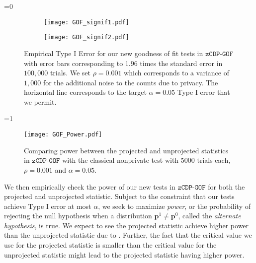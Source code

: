 \documentclass[twoside,letterpaper]{article} \usepackage{aistats2017}
\theoremstyle{definition}
\theoremstyle{remark}
\begin{document}
=0
\begin{figure}
\begin{center}
\begin{subfigure}{.45\textwidth}
\begin{flushleft}
\texttt{[image: GOF\_signif1.pdf]}
\end{flushleft}
\end{subfigure}
\hspace{10mm}
\begin{subfigure}{.1\textwidth}
\end{subfigure}
\begin{subfigure}{.45\textwidth}
\begin{flushright}
\texttt{[image: GOF\_signif2.pdf]}
\end{flushright}
\end{subfigure}
\caption{Empirical Type I Error for our new goodness of fit tests in ${\texttt{zCDP-GOF}}$ with error bars corresponding to 1.96 times the standard error in $100,000$ trials. We set $\rho = 0.001$ which corresponds to a variance of $1,000$ for the additional noise to the counts due to privacy.  The horizontal line corresponds to the target $\alpha = 0.05$ Type I error that we permit.  \label{fig:GOF_signif} }
\end{center}
\end{figure}
\fi

=1
\begin{figure}
\centering
\texttt{[image: GOF\_Power.pdf]}
\caption{\small Comparing power between the projected and unprojected statistics in ${\texttt{zCDP-GOF}}$ with the classical nonprivate test with $5000$ trials each, $\rho =0.001$ and $\alpha = 0.05$. \label{fig:power_gof}}
\end{figure}
\fi

We then empirically check the power of our new tests in ${\texttt{zCDP-GOF}}$ for both the projected and unprojected statistic.  Subject to the constraint that our tests achieve Type I error at most $\alpha$, we seek to maximize \emph{power}, or the probability of rejecting the null hypothesis when a distribution ${\mathbf{p}}^1 \neq {{\mathbf{p}}^0}$, called the \emph{alternate hypothesis}, is true.  
We expect to see the projected statistic achieve higher power than the unprojected statistic due to .  Further, the fact that the critical value we use for the projected statistic is smaller than the critical value for the unprojected statistic might lead to the projected statistic having higher power.  
\end{document}
